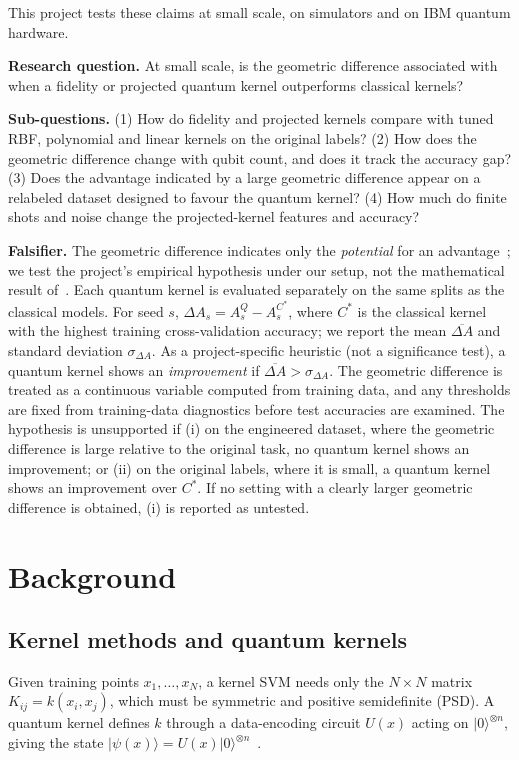 \documentclass[conference]{IEEEtran}
\begin{document}
This project tests these claims at small scale, on simulators and on IBM quantum hardware.

\textbf{Research question.} At small scale, is the geometric difference associated with when a fidelity or projected quantum kernel outperforms classical kernels?

\textbf{Sub-questions.} (1) How do fidelity and projected kernels compare with tuned RBF, polynomial and linear kernels on the original labels? (2) How does the geometric difference change with qubit count, and does it track the accuracy gap? (3) Does the advantage indicated by a large geometric difference appear on a relabeled dataset designed to favour the quantum kernel? (4) How much do finite shots and noise change the projected-kernel features and accuracy?

\textbf{Falsifier.} The geometric difference indicates only the \emph{potential} for an advantage~\cite{huang2021}; we test the project's empirical hypothesis under our setup, not the mathematical result of~\cite{huang2021}. Each quantum kernel is evaluated separately on the same splits as the classical models. For seed $s$, $\Delta A_s = A^{Q}_s - A^{C^\ast}_s$, where $C^\ast$ is the classical kernel with the highest training cross-validation accuracy; we report the mean $\overline{\Delta A}$ and standard deviation $\sigma_{\Delta A}$. As a project-specific heuristic (not a significance test), a quantum kernel shows an \emph{improvement} if $\overline{\Delta A} > \sigma_{\Delta A}$. The geometric difference is treated as a continuous variable computed from training data, and any thresholds are fixed from training-data diagnostics before test accuracies are examined. The hypothesis is unsupported if (i) on the engineered dataset, where the geometric difference is large relative to the original task, no quantum kernel shows an improvement; or (ii) on the original labels, where it is small, a quantum kernel shows an improvement over $C^\ast$. If no setting with a clearly larger geometric difference is obtained, (i) is reported as untested.

\section{Background}
\subsection{Kernel methods and quantum kernels}
Given training points $x_1,\dots,x_N$, a kernel SVM needs only the $N\times N$ matrix $K_{ij}=k(x_i,x_j)$, which must be symmetric and positive semidefinite (PSD). A quantum kernel defines $k$ through a data-encoding circuit $U(x)$ acting on $|0\rangle^{\otimes n}$, giving the state $|\psi(x)\rangle=U(x)|0\rangle^{\otimes n}$~\cite{schuld2019,havlicek2019}.
\end{document}
